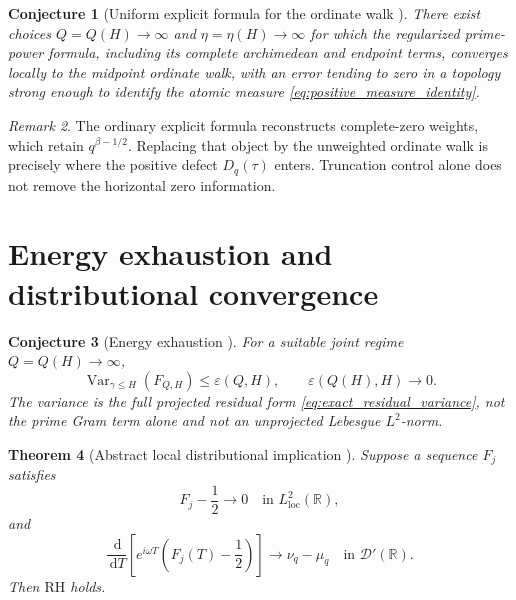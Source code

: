 \documentclass[11pt]{amsart}
\numberwithin{equation}{section}
\theoremstyle{plain}
\newtheorem{theorem}{Theorem}[section]
\newtheorem{conjecture}[theorem]{Conjecture}
\theoremstyle{definition}
\theoremstyle{remark}
\newtheorem{remark}[theorem]{Remark}
\DeclareMathOperator{\Var}{Var}
\newcommand{\RH}{\mathrm{RH}}
\newcommand{\1}{\mathbf{1}}
\newcommand{\dd}{\,\mathrm{d}}
\begin{document}
\begin{conjecture}[Uniform explicit formula for the ordinate walk {\normalfont[Conjecture]}]
\label{conj:uniform_explicit_formula}
There exist choices \(Q=Q(H)\to\infty\) and
\(\eta=\eta(H)\to\infty\) for which the regularized prime-power formula,
including its complete archimedean and endpoint terms, converges locally
to the midpoint ordinate walk, with an error tending to zero in a
topology strong enough to identify the atomic measure
\eqref{eq:positive_measure_identity}.
\end{conjecture}

\begin{remark}
\label{rem:uniform_bridge_is_RH_interface}
The ordinary explicit formula reconstructs complete-zero weights, which
retain \(q^{\beta-1/2}\).  Replacing that object by the unweighted
ordinate walk is precisely where the positive defect
\(D_q(\tau)\) enters.  Truncation control alone does not remove the
horizontal zero information.
\end{remark}

\section{Energy exhaustion and distributional convergence}
\label{sec:two_main_lemmas}

\begin{conjecture}[Energy exhaustion {\normalfont[Conjecture]}]
\label{conj:energy_exhaustion}
For a suitable joint regime \(Q=Q(H)\to\infty\),
\begin{equation}
\Var_{\gamma\leq H}(F_{Q,H})
\leq
\varepsilon(Q,H),
\qquad
\varepsilon(Q(H),H)\to0.
\label{eq:energy_exhaustion}
\end{equation}
The variance is the full projected residual form
\eqref{eq:exact_residual_variance}, not the prime Gram term alone and not
an unprojected Lebesgue \(L^2\)-norm.
\end{conjecture}


\begin{theorem}[Abstract local distributional implication {}]
\label{thm:distributional_implication}
Suppose a sequence \(F_j\) satisfies
\begin{equation}
F_j-\frac12\longrightarrow0
\quad\text{in }L^2_{\mathrm{loc}}(\mathbb R),
\label{eq:local_L2_convergence}
\end{equation}
and
\begin{equation}
\frac{\dd}{\dd T}
\left[
e^{i\omega T}
\left(F_j(T)-\frac12\right)
\right]
\longrightarrow
\nu_q-\mu_q
\quad\text{in }\mathcal D'(\mathbb R).
\label{eq:derivative_distributional_identification}
\end{equation}
Then \(\RH\) holds.
\end{theorem}
\end{document}
